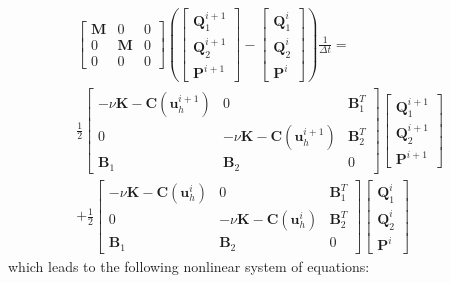 \begin{gather*}
	\begin{bmatrix}
		\mathbf{M} & 0 & 0 \\
		0 & \mathbf{M} & 0 \\
		0 & 0 & 0
	\end{bmatrix}
	\left(\begin{bmatrix}
		\mathbf{Q}_1^{i+1}\\
		\mathbf{Q}_2^{i+1}\\
		\mathbf{P}^{i+1}
	\end{bmatrix}
	-
	\begin{bmatrix}
		\mathbf{Q}_1^{i}\\
		\mathbf{Q}_2^{i}\\
		\mathbf{P}^{i}
	\end{bmatrix}\right)
	\frac{1}{\Delta t}
	= \\
	\frac{1}{2}
	\begin{bmatrix}
	-\nu\mathbf{K} - \mathbf{C}(\mathbf{u}_h^{i+1}) & 0 & \mathbf{B}^T_1 \\
	0 & -\nu\mathbf{K} - \mathbf{C}(\mathbf{u}_h^{i+1}) & \mathbf{B}^T_2 \\
	\mathbf{B}_1 & \mathbf{B}_2 & 0
	\end{bmatrix}
	\begin{bmatrix}
	\mathbf{Q}_1^{i+1}\\
	\mathbf{Q}_2^{i+1}\\
	\mathbf{P}^{i+1}
	\end{bmatrix}\\
	+\frac{1}{2}\begin{bmatrix}
	-\nu\mathbf{K} - \mathbf{C}(\mathbf{u}_h^i) & 0 & \mathbf{B}^T_1 \\
	0 & -\nu\mathbf{K} - \mathbf{C}(\mathbf{u}_h^i) & \mathbf{B}^T_2 \\
	\mathbf{B}_1 & \mathbf{B}_2 & 0
	\end{bmatrix}
	\begin{bmatrix}
	\mathbf{Q}_1^i\\
	\mathbf{Q}_2^i\\
	\mathbf{P}^i
	\end{bmatrix}
\end{gather*}
which leads to the following nonlinear system of equations:
